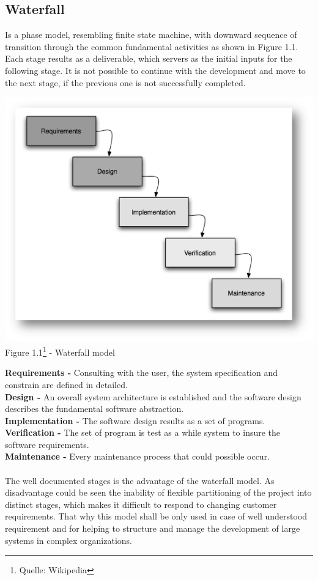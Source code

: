 \subsection{Waterfall}
Is a phase model, resembling finite state machine, with downward sequence of transition through the common fundamental  activities as shown in Figure 1.1. Each stage results as a deliverable, which servers as the initial inputs for the following stage. It is not possible to continue with the development and move to the next stage, if the previous one is not successfully completed.
\begin{center}
\includegraphics[scale=0.75]{Images/Waterfall_model.png}\\
Figure 1.1\footnote{Quelle: Wikipedia} - Waterfall model
\end{center}
{\bf Requirements -} Consulting with the user, the system specification and constrain are defined in detailed.\\
{\bf Design -} An overall system architecture is established and the software design describes the fundamental software abstraction.\\
{\bf Implementation -} The software design results as a set of programs.\\
{\bf Verification -} The set of program is test as a while system to insure the software requirements.\\
{\bf Maintenance -} Every maintenance process that could possible occur.\\ \\
The well documented stages is the advantage of the waterfall model. As disadvantage could be seen the inability of flexible partitioning of the project into distinct stages, which makes it difficult to respond to changing customer requirements. That why this model shall be only used in case of well understood requirement and for helping to structure and manage the development of large systems in complex organizations.\\
